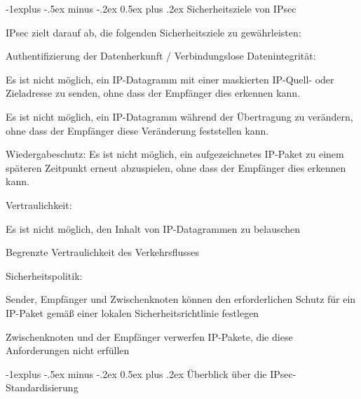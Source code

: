 \documentclass[a4paper]{article}
\makeatletter
\renewcommand{\subsection}{\@startsection{subsection}{2}{0mm}%
 {-1explus -.5ex minus -.2ex}%
 {0.5ex plus .2ex}%
 {\normalfont\normalsize\bfseries}}
\makeatother
\begin{document}
\begin{multicols}{3}
      \subsection{Sicherheitsziele von
            IPsec}

      \begin{itemize*}
            \item IPsec zielt darauf ab, die folgenden Sicherheitsziele zu
            gewährleisten:
            \begin{itemize*}
                  \item Authentifizierung der Datenherkunft / Verbindungslose Datenintegrität:
                  \begin{itemize*} \item Es ist nicht möglich, ein IP-Datagramm mit einer maskierten IP-Quell- oder Zieladresse zu senden, ohne dass der Empfänger dies erkennen kann. \item Es ist nicht möglich, ein IP-Datagramm während der Übertragung zu verändern, ohne dass der Empfänger diese Veränderung feststellen kann. \item Wiedergabeschutz: Es ist nicht möglich, ein aufgezeichnetes IP-Paket zu einem späteren Zeitpunkt erneut abzuspielen, ohne dass der Empfänger dies erkennen kann. \end{itemize*}
                  \item Vertraulichkeit:
                  \begin{itemize*} \item Es ist nicht möglich, den Inhalt von IP-Datagrammen zu belauschen \item Begrenzte Vertraulichkeit des Verkehrsflusses \end{itemize*}
            \end{itemize*}
            \item Sicherheitspolitik:
            \begin{itemize*}
                  \item Sender, Empfänger und Zwischenknoten können den erforderlichen Schutz für ein IP-Paket gemäß einer lokalen Sicherheitsrichtlinie festlegen
                  \item Zwischenknoten und der Empfänger verwerfen IP-Pakete, die diese Anforderungen nicht erfüllen
            \end{itemize*}
      \end{itemize*}


      \subsection{Überblick über die
            IPsec-Standardisierung}


\end{multicols}
\end{document}
